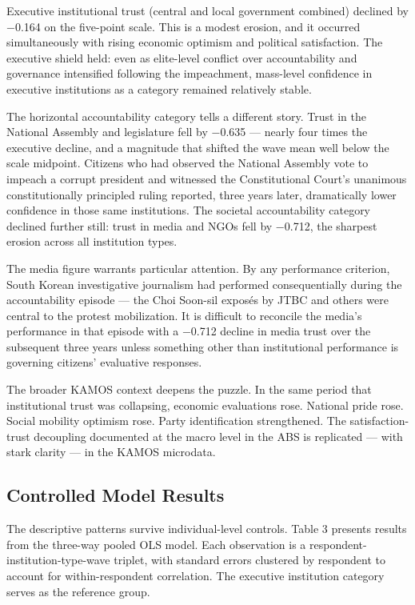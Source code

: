 \documentclass[
  12pt,
  letterpaper]{article}
\begin{document}
Executive institutional trust (central and local government combined)
declined by −0.164 on the five-point scale. This is a modest erosion,
and it occurred simultaneously with rising economic optimism and
political satisfaction. The executive shield held: even as elite-level
conflict over accountability and governance intensified following the
impeachment, mass-level confidence in executive institutions as a
category remained relatively stable.

The horizontal accountability category tells a different story. Trust in
the National Assembly and legislature fell by −0.635 --- nearly four
times the executive decline, and a magnitude that shifted the wave mean
well below the scale midpoint. Citizens who had observed the National
Assembly vote to impeach a corrupt president and witnessed the
Constitutional Court's unanimous constitutionally principled ruling
reported, three years later, dramatically lower confidence in those same
institutions. The societal accountability category declined further
still: trust in media and NGOs fell by −0.712, the sharpest erosion
across all institution types.

The media figure warrants particular attention. By any performance
criterion, South Korean investigative journalism had performed
consequentially during the accountability episode --- the Choi Soon-sil
exposés by JTBC and others were central to the protest mobilization. It
is difficult to reconcile the media's performance in that episode with a
−0.712 decline in media trust over the subsequent three years unless
something other than institutional performance is governing citizens'
evaluative responses.

The broader KAMOS context deepens the puzzle. In the same period that
institutional trust was collapsing, economic evaluations rose. National
pride rose. Social mobility optimism rose. Party identification
strengthened. The satisfaction-trust decoupling documented at the macro
level in the ABS is replicated --- with stark clarity --- in the KAMOS
microdata.

\subsection{Controlled Model Results}\label{controlled-model-results}

The descriptive patterns survive individual-level controls. Table 3
presents results from the three-way pooled OLS model. Each observation
is a respondent-institution-type-wave triplet, with standard errors
clustered by respondent to account for within-respondent correlation.
The executive institution category serves as the reference group.
\end{document}
